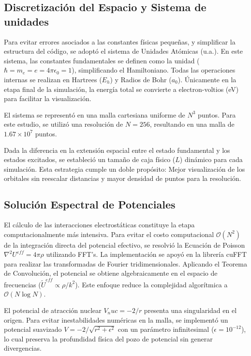 \documentclass[aps,twocolumn,preprintnumbers]{revtex4}
\begin{document}
  \subsection{Discretización del Espacio y Sistema de unidades}

  Para evitar errores asociados a las constantes físicas pequeñas, y simplificar la estructura del código, se adoptó el sistema de Unidades Atómicas (u.a.). En este sistema, las constantes fundamentales se definen como la unidad ($\hbar = m_e = e = 4\pi\epsilon_0=1$), simplificando el Hamiltoniano. Todas las operaciones internas se realizan en Hartrees ($E_h$) y Radios de Bohr ($a_0$). Únicamente en la etapa final de la simulación, la energía total se convierte a electron-voltios (eV) para facilitar la visualización.

  El sistema se representó en una malla cartesiana uniforme de $N^3$ puntos. Para este estudio, se utilizó una resolución de $N=256$, resultando en una malla de $1.67\times10^7$ puntos.

  Dada la diferencia en la extensión espacial entre el estado fundamental y los estados excitados, se estableció un tamaño de caja físico ($L$) dinámico para cada simulación. Esta estrategia cumple un doble propósito: Mejor visualización de los orbitales sin reescalar distancias y mayor densidad de puntos para la resolución.

  \subsection{Solución Espectral de Potenciales}

  El cálculo de las interacciones electrostáticas constituye la etapa computacionalmente más intensiva. Para evitar el costo computacional $\mathcal{O}(N^2)$ de la integración directa del potencial efectivo, se resolvió la Ecuación de Poisson $\nabla^2 U^{eff} = 4\pi\rho$ utilizando FFT's. La implementación se apoyó en la librería cuFFT para realizar las transformadas de Fourier tridimensionales. Aplicando el Teorema de Convolución, el potencial se obtiene algebraicamente en el espacio de frecuencias ($\tilde{U}^{eff} \propto \rho/k^2$). Este enfoque reduce la complejidad algorítmica a $\mathcal{O}(N\log N)$.

  El potencial de atracción nuclear $V_nuc = -2/r$ presenta una singularidad en el origen. Para evitar inestabilidades numéricas en la malla, se implementó un potencial suavizado $V = -2/\sqrt{r^2 + \epsilon^2}$ con un parámetro infinitesimal ($\epsilon = 10^{-12}$), lo cual preserva la profundidad física del pozo de potencial sin generar divergencias.
\end{document}
